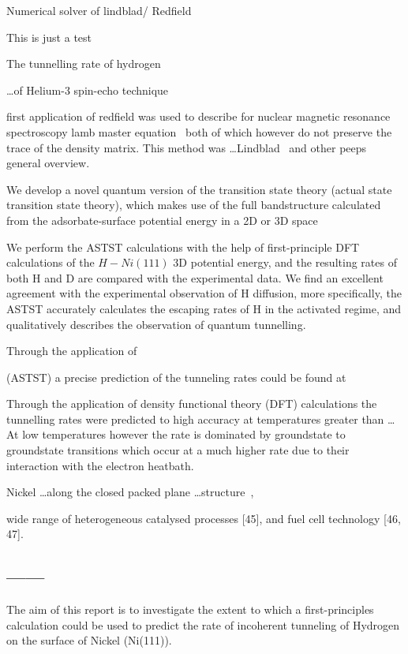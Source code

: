 
Numerical solver of lindblad/ Redfield



This is just a test

The tunnelling rate of
hydrogen

\ldots of Helium-3 spin-echo
technique~\cite{Helium_spin_echo}

first application of redfield was used to
describe for nuclear magnetic resonance spectroscopy\cite{REDFIELD19651}
lamb master equation~\cite{PhysRev.134.A1429}
both of which however do not preserve the trace of the density matrix.
This method was \ldots Lindblad~\cite{Lindblad1976} and other peeps\cite{doi:10.1063/1.522979}
general overview\cite{Chru_ci_ski_2017}.

We develop a novel quantum version of the transition state theory (actual state transition
state theory), which makes use of the full bandstructure calculated from the adsorbate-surface
potential energy in a 2D or 3D space


We perform the ASTST calculations with the help of first-principle DFT calculations of
the \(H-Ni(111)\) 3D potential energy, and the resulting rates of both H and D are compared with
the experimental data. We find an excellent agreement with the experimental observation
of H diffusion, more specifically, the ASTST accurately calculates the escaping rates of H
in the activated regime, and qualitatively describes the observation of quantum tunnelling.



Through the application of

(ASTST) a precise prediction
of the tunneling rates could be
found at

Through the application of
density functional theory (DFT)
calculations the tunnelling
rates were predicted to high
accuracy at temperatures greater
than \ldots\cite{Jianding-Zhu}
At low temperatures however
the rate is dominated
by groundstate to groundstate
transitions which occur
at a much higher rate due to
their interaction with the
electron heatbath.

\cite{Manzano_2020}
Nickel \ldots along the closed packed plane \ldots structure~\cite{Jianding-Zhu},


wide range of heterogeneous catalysed processes [45], and fuel cell technology [46, 47].

\subsection{------}
The aim of this report is to
investigate the extent to which
a first-principles calculation
could be used to predict the rate of
incoherent tunneling of Hydrogen
on the surface of Nickel (Ni(111)).

